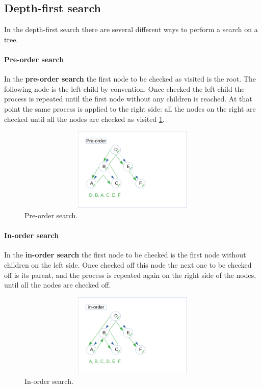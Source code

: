 \subsection{Depth-first search}
In the depth-first search there are several different ways to perform a search on a tree.
\paragraph{Pre-order search}
In the \textbf{pre-order search} the first node to be checked as visited is the root. The following node is the left child by convention. Once checked the left child the process is repeated until the first node without any children is reached. At that point the same process is applied to the right side: all the nodes on the right are checked until all the nodes are checked as visited \ref{trees_5}.

\begin{figure}[hb]
	\includegraphics[width=12cm,height=4cm]{chapters/trees/images/trees_5.pdf}
	\caption[]{Pre-order search.}
	\label{trees_5}
\end{figure}

\paragraph{In-order search}
In the \textbf{in-order search} the first node to be checked is the first node without children on the left side. Once checked off this node the next one to be checked off is its parent, and the process is repeated again on the right side of the nodes, until all the nodes are checked off.

\begin{figure}[hb]
	\includegraphics[width=12cm,height=4cm]{chapters/trees/images/trees_6.pdf}
	\caption[]{In-order search.}
	\label{trees_6}
\end{figure}

